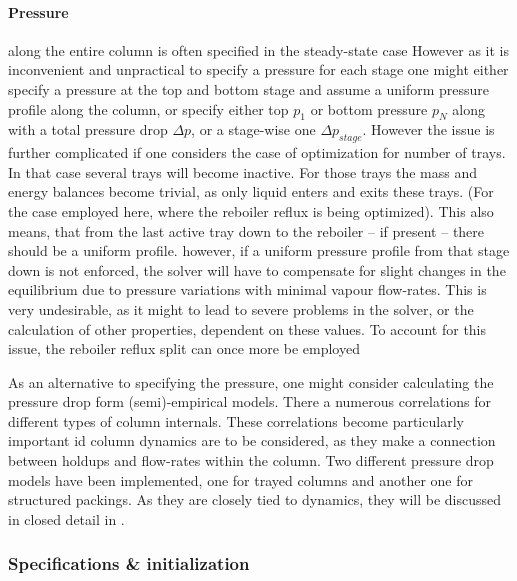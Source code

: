         \paragraph{Pressure} along the entire column is often specified in the steady-state case
        However as it is inconvenient and unpractical to specify a pressure for each stage one might either specify
        a pressure at the top and bottom stage and assume a uniform pressure profile along the column, or
        specify either top $p_1$ or bottom pressure $p_N$ along with a total pressure drop $\Delta p$,
        or a stage-wise one $\Delta p_{stage}$. However the issue is further complicated if one considers the
        case of optimization for number of trays. In that case several trays will become inactive. For those
        trays the mass and energy balances become trivial, as only liquid enters and exits these trays.
        (For the case employed here, where the reboiler reflux is being optimized). This also means,
        that from the last active tray down to the reboiler -- if present -- there should be a uniform
        profile. however, if a uniform pressure profile from that stage down is not enforced, the solver
        will have to compensate for slight changes in the equilibrium due to pressure variations with minimal
        vapour flow-rates. This is very undesirable, as it might to lead to severe problems in the solver,
        or the calculation of other properties, dependent on these values. To account for this issue, the reboiler
        reflux split can once more be employed

        As an alternative to specifying the pressure, one might consider calculating the pressure drop
        form (semi)-empirical models. There a numerous correlations for different types of column internals.
        These correlations become particularly important id column dynamics are to be considered, as they
        make a connection between holdups and flow-rates within the column. Two different pressure drop models
        have been implemented, one for trayed columns and another one for structured packings. As they are closely
        tied to dynamics, they will be discussed in closed detail in .

    \subsubsection{Specifications \& initialization}
    \label{sec:mathpro:steady:specinit}

